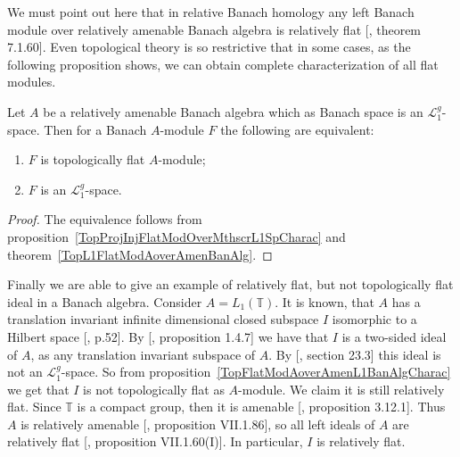 We must point out here that in relative Banach homology any left Banach module
over relatively amenable Banach algebra is relatively flat
[\cite{HelBanLocConvAlg}, theorem 7.1.60]. Even topological theory is so
restrictive that in some cases, as the following proposition shows, we can
obtain complete characterization of all flat modules.

\begin{proposition}\label{TopFlatModAoverAmenL1BanAlgCharac} Let $A$ be a
relatively amenable Banach algebra which as Banach space is an
$\mathscr{L}_1^g$-space. Then for a Banach $A$-module $F$ the following are
equivalent:

\begin{enumerate}[label = (\roman*)]
    \item $F$ is topologically flat $A$-module; 

    \item $F$ is an $\mathscr{L}_1^g$-space.
\end{enumerate}
\end{proposition}
\begin{proof} The equivalence follows from
proposition~\ref{TopProjInjFlatModOverMthscrL1SpCharac} and
theorem~\ref{TopL1FlatModAoverAmenBanAlg}.
\end{proof}

Finally we are able to give an example of relatively flat, but not topologically
flat ideal in a Banach algebra. Consider $A=L_1(\mathbb{T})$. It is known, that
$A$ has a translation invariant infinite dimensional closed subspace $I$
isomorphic to a Hilbert space [\cite{RosProjTransInvSbspLpG}, p.52]. By
[\cite{KaniBanAlg}, proposition 1.4.7] we have that $I$ is a two-sided ideal of
$A$, as any translation invariant subspace of $A$. By [\cite{DefFloTensNorOpId},
section 23.3] this ideal is not an $\mathscr{L}_1^g$-space. So from
proposition~\ref{TopFlatModAoverAmenL1BanAlgCharac} we get that $I$ is not
topologically flat as $A$-module. We claim it is still relatively flat. Since
$\mathbb{T}$ is a compact group, then it is amenable [\cite{PierAmenLCA},
proposition 3.12.1]. Thus $A$ is relatively amenable [\cite{HelBanLocConvAlg},
proposition VII.1.86], so all left ideals of $A$ are relatively flat
[\cite{HelBanLocConvAlg}, proposition VII.1.60(I)]. In particular, $I$ is
relatively flat.


